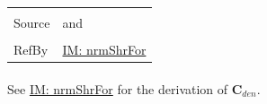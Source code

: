 \documentclass[12pt]{article}
\begin{document}
\begin{minipage}{\textwidth}
\begin{tabular}{>{\raggedright}p{}>{\raggedright\arraybackslash}p{}}
\\ \midrule \\
Source & \cite{chen2005} and \cite{karchewski2012}
         
\\ \midrule \\
RefBy & \hyperref[IM:nrmShrFor]{IM: nrmShrFor}
        
\\ \bottomrule
\end{tabular}
\end{minipage}
\paragraph{}
\label{IM:nrmShrForDenDeriv}
See \hyperref[IM:nrmShrFor]{IM: nrmShrFor} for the derivation of ${\mathbf{C}_{den}}$.
\end{document}
